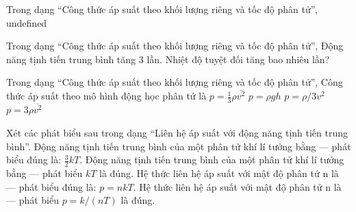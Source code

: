 \begin{bt}
Trong dạng “Công thức áp suất theo khối lượng riêng và tốc độ phân tử”, undefined
\end{bt}

\begin{ex}
Trong dạng “Công thức áp suất theo khối lượng riêng và tốc độ phân tử”, Động năng tịnh tiến trung bình tăng 3 lần. Nhiệt độ tuyệt đối tăng bao nhiêu lần?
\end{ex}

\begin{ex}
Trong dạng “Công thức áp suất theo khối lượng riêng và tốc độ phân tử”, Công thức áp suất theo mô hình động học phân tử là
\choice
{\True $p=\frac13\rho\overline{v^2}$}
{$p=\rho gh$}
{$p=\rho/3v^2$}
{$p=3\rho\overline{v^2}$}
\end{ex}

\begin{ex}
Xét các phát biểu sau trong dạng “Liên hệ áp suất với động năng tịnh tiến trung bình”.
\choiceTF
{\True Động năng tịnh tiến trung bình của một phân tử khí lí tưởng bằng — phát biểu đúng là: $\frac32kT$.}
{Động năng tịnh tiến trung bình của một phân tử khí lí tưởng bằng — phát biểu $kT$ là đúng.}
{\True Hệ thức liên hệ áp suất với mật độ phân tử n là — phát biểu đúng là: $p=nkT$.}
{Hệ thức liên hệ áp suất với mật độ phân tử n là — phát biểu $p=k/(nT)$ là đúng.}
\end{ex}

